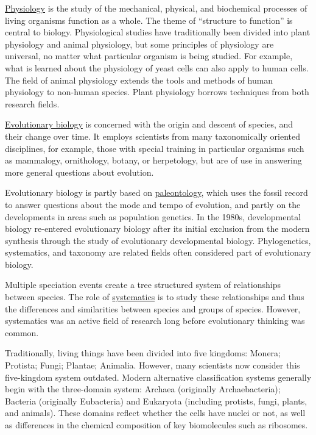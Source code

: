 \documentclass[
]{article}
\begin{document}
\href{https://en.wikipedia.org/wiki/Physiology}{Physiology} is the study
of the mechanical, physical, and biochemical processes of living
organisms function as a whole. The theme of ``structure to function'' is
central to biology. Physiological studies have traditionally been
divided into plant physiology and animal physiology, but some principles
of physiology are universal, no matter what particular organism is being
studied. For example, what is learned about the physiology of yeast
cells can also apply to human cells. The field of animal physiology
extends the tools and methods of human physiology to non-human species.
Plant physiology borrows techniques from both research fields.

\href{https://en.wikipedia.org/wiki/Evolutionary_biology}{Evolutionary
biology} is concerned with the origin and descent of species, and their
change over time. It employs scientists from many taxonomically oriented
disciplines, for example, those with special training in particular
organisms such as mammalogy, ornithology, botany, or herpetology, but
are of use in answering more general questions about evolution.

Evolutionary biology is partly based on
\href{https://en.wikipedia.org/wiki/Paleontology}{paleontology}, which
uses the fossil record to answer questions about the mode and tempo of
evolution, and partly on the developments in areas such as population
genetics. In the 1980s, developmental biology re-entered evolutionary
biology after its initial exclusion from the modern synthesis through
the study of evolutionary developmental biology. Phylogenetics,
systematics, and taxonomy are related fields often considered part of
evolutionary biology.

Multiple speciation events create a tree structured system of
relationships between species. The role of
\href{https://en.wikipedia.org/wiki/Systematics}{systematics} is to
study these relationships and thus the differences and similarities
between species and groups of species. However, systematics was an
active field of research long before evolutionary thinking was common.

Traditionally, living things have been divided into five kingdoms:
Monera; Protista; Fungi; Plantae; Animalia. However, many scientists now
consider this five-kingdom system outdated. Modern alternative
classification systems generally begin with the three-domain system:
Archaea (originally Archaebacteria); Bacteria (originally Eubacteria)
and Eukaryota (including protists, fungi, plants, and animals). These
domains reflect whether the cells have nuclei or not, as well as
differences in the chemical composition of key biomolecules such as
ribosomes.
\end{document}
